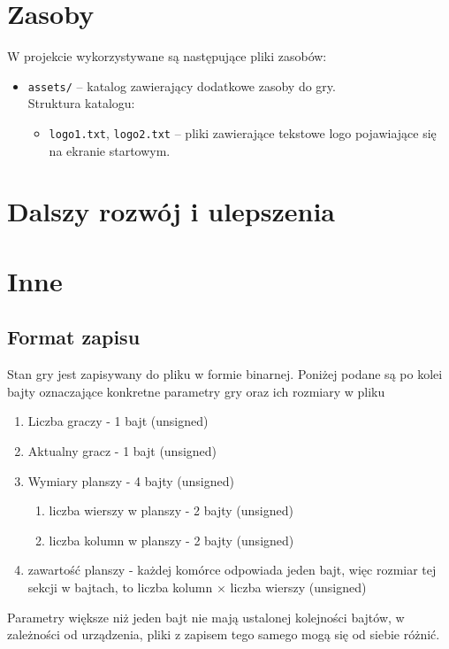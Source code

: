 \documentclass{article}
\begin{document}
\section{Zasoby}

W projekcie wykorzystywane są następujące pliki zasobów:
    \begin{itemize}
    \item \texttt{assets/} – katalog zawierający dodatkowe zasoby do gry.\\
    Struktura katalogu:
        \begin{itemize}
            \item \texttt{logo1.txt}, \texttt{logo2.txt} – pliki zawierające tekstowe logo pojawiające się na ekranie startowym.
        \end{itemize}
    \end{itemize}

\section{Dalszy rozwój i ulepszenia}

\section{Inne}

\subsection{Format zapisu}

Stan gry jest zapisywany do pliku w formie binarnej. Poniżej podane są po kolei bajty oznaczające konkretne parametry gry oraz ich rozmiary w pliku

\begin{enumerate}
\item Liczba graczy - 1 bajt (unsigned)
\item Aktualny gracz - 1 bajt (unsigned)
\item Wymiary planszy - 4 bajty (unsigned)
  \begin{enumerate}
    \item liczba wierszy w planszy - 2 bajty (unsigned)
    \item liczba kolumn w planszy - 2 bajty (unsigned)
  \end{enumerate}
\item zawartość planszy - każdej komórce odpowiada jeden bajt, więc rozmiar tej sekcji w bajtach, to liczba kolumn $\times$ liczba wierszy (unsigned)
\end{enumerate}

Parametry większe niż jeden bajt nie mają ustalonej kolejności bajtów, w zależności od urządzenia, pliki z zapisem tego samego mogą się od siebie różnić.
\end{document}
